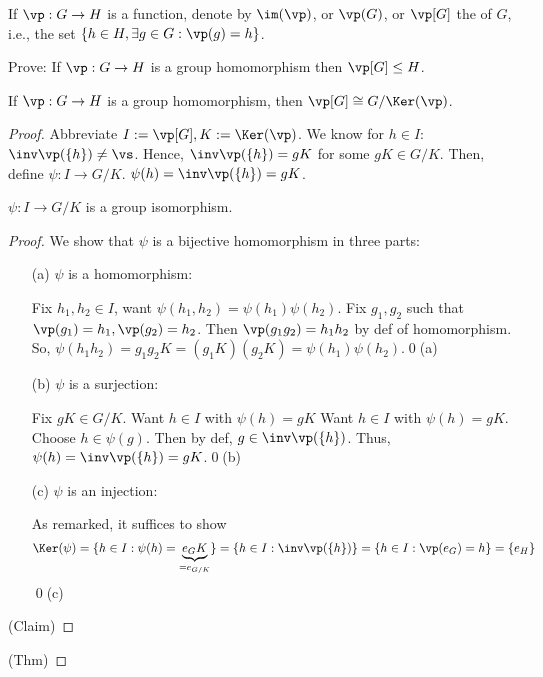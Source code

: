 \documentclass[notes.tex]{subfiles}
\begin{document}

\begin{defn}
	If $\vp:G\to H$ is a function, denote by $\im(\vp)$, or $\vp(G)$, or $\vp[G]$ the  of $G$, i.e., the set $\{h\in H, \exists g\in G: \vp(g) = h\}$.
\end{defn}

\begin{exercise}
	Prove: If $\vp:G\to H$ is a group homomorphism then $\vp[G] \le H$.
\end{exercise}

\begin{theorem}
	If $\vp:G\to H$ is a group homomorphism, then $\vp[G]\cong G/\Ker(\vp)$.
\end{theorem}

\begin{proof}
	Abbreviate $I:=\vp[G], K:= \Ker(\vp)$.
	We know for $h\in I$: $\inv\vp(\{h\}) \ne \vs$.
	Hence, $\inv\vp(\{h\})=gK$ for some $gK\in G/K$.
	Then, define $\psi:I \to G/K$. $\psi(h) = \inv\vp(\{h\})=gK$.

	\begin{claim}
		$\psi:I\to G/K$ is a group isomorphism.
	\end{claim}
	\begin{proof} We show that $\psi$ is a bijective homomorphism in three parts:
		\begin{itemize}
			\item[(a)] $\psi$ is a homomorphism:

			Fix $h_1, h_2\in I$, want $\psi(h_1, h_2) = \psi(h_1)\psi(h_2)$.
			Fix $g_1, g_2$ such that $\vp(g_1) = h_1, \vp(g_2) = h_2$.
			Then $\vp(g_1g_2) = h_1h_2$ by def of homomorphism. So, $\psi(h_1h_2) = g_1g_2K = (g_1K)(g_2K) = \psi(h_1)\psi(h_2)$.\qed(a)
			\item[(b)] $\psi$ is a surjection:

				Fix $gK\in G/K$. Want $h\in I$ with $\psi(h) = gK$
				Want $h\in I$ with $\psi(h) = gK.$ Choose $h\in \psi(g)$.
				Then by def, $g\in \inv\vp(\{h\})$. Thus, $\psi(h) = \inv\vp(\{h\})=gK$.\qed(b)
			\item[(c)] $\psi$ is an injection:

				As remarked, it suffices to show 
				\[\Ker(\psi) = \{h\in I : \psi(h) = \underbrace{e_GK}_{=e_{G/K}}\} = \{h\in I : \inv\vp(\{h\})\} = \{h\in I : \vp(e_G) = h\} = \{e_H\}
				\]\qed(c)
		\end{itemize}
		\qedhere(Claim)
	\end{proof}
	\qedhere(Thm)
\end{proof}
\end{document}
